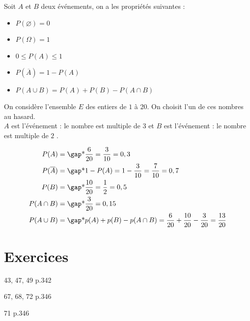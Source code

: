 \documentclass[10pt,a4paper,openany,twoside, prof]{book}
\begin{document}
\begin{prop}{}{}
Soit $A$ et $B$ deux événements, on a les propriétés suivantes :

\begin{minipage}{8cm}
\begin{itemize}
\item  $P(\varnothing)=0$
\item  $P(\Omega)=1$
\end{itemize}
\end{minipage}
\begin{minipage}{9cm}
\begin{itemize}
\item  $0 \leqslant P(A) \leqslant 1$
\item  $P(\overline{A})=1-P(A)$
\item  $P(A\cup B)=P(A)+P(B)-P(A\cap B)$
\end{itemize}
\end{minipage}
\end{prop}

\begin{ex}{}{}
On considère l'ensemble $E$ des entiers de $1$ à $20$. On choisit l'un de ces nombres au hasard. \\
$A$ est l'événement : \og le nombre est multiple de $3$ \fg{} et $B$ est l'événement : \og le nombre est multiple de $2$ \fg.

\begin{align*}
   P(A) &=\troum{\dfrac{6}{20}=\dfrac{3}{10}=0,3}\\
   P(\overline{A}) &=\troum{1-P(A)=1-\dfrac{3}{10}=\dfrac{7}{10}=0,7}\\
   P(B) &=\troum{\dfrac{10}{20}=\dfrac{1}{2}=0,5}\\
   P(A \cap B)&=\troum{\dfrac{3}{20}=0,15}\\
   P(A \cup B)&=\troum{p(A)+p(B)-p(A\cap B)=\dfrac{6}{20}+\dfrac{10}{20}-\dfrac{3}{20}=\dfrac{13}{20}}
\end{align*}
\end{ex}

\newpage
\section*{Exercices}
\begin{exercices}
	\begin{bookexos}{43, 47, 49 p.342}\end{bookexos}
	\begin{bookexos}{67, 68, 72 p.346}\end{bookexos}
	\begin{bookexo}{71 p.346}\end{bookexo}
\end{exercices}
\end{document}
